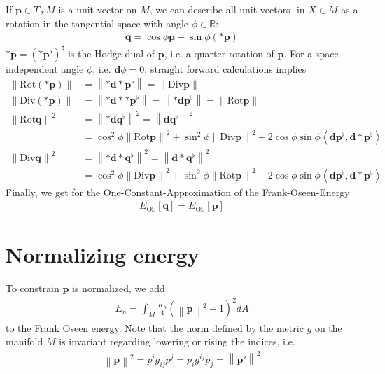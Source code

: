 \documentclass{scrartcl}
\newcommand{\exd}{\mathbf{d}}
\newcommand{\Div}{\text{Div}}
\newcommand{\Rot}{\text{Rot}}
\newcommand{\R}{\mathds{R}}
\newcommand{\M}{M}
\newcommand{\dA}{dA}
\newcommand{\p}{\mathbf{p}}
\newcommand{\q}{\mathbf{q}}
\newcommand{\pfl}{\mathbf{p}^{\flat}}
\newcommand{\qfl}{\mathbf{q}^{\flat}}
\newcommand{\EOS}{E_{\text{OS}}}
\newcommand{\EN}{E_{n}}
\begin{document}
  If \( \p\in T_{X}\M \) is a unit vector on \( \M \), we can describe all unit vectors \(  \) in \( X\in\M \) as a rotation in the tangential space
  with angle \( \phi\in\R \):
  \begin{align}
    \q = \cos\phi\p + \sin\phi\left( *\p \right)
  \end{align}
  \( *\p = \left( *\pfl \right)^{\sharp}\) is the Hodge dual of \( \p \), i.e. a quarter rotation of \( \p \). 
  For a space independent angle \( \phi \), i.e. \( \exd\phi=0 \), straight forward calculations implies
  \begin{align}
     \left\| \Rot (*\p) \right\| &=  \left\| *\exd*\pfl \right\| = \left\| \Div\p \right\|\\
     \left\| \Div (*\p) \right\| &= \left\| *\exd**\pfl  \right\| = \left\| *\exd\pfl  \right\| = \left\|\Rot\p\right\|\\ 
     \left\| \Rot\q \right\|^{2} &= \left\| *\exd\qfl \right\|^{2} = \left\| \exd\qfl \right\|^{2} \\
                                      &=  \cos^{2}\phi\left\| \Rot\p \right\|^{2} 
                                        + \sin^{2}\phi\left\| \Div\p \right\|^{2}
                                        + 2\cos\phi\sin\phi\left\langle \exd\pfl, \exd * \pfl \right\rangle\\
    \left\| \Div\q \right\|^{2} &= \left\| *\exd*\qfl \right\|^{2} = \left\| \exd*\qfl \right\|^{2}\\
                                     &= \cos^{2}\phi\left\| \Div\p \right\|^{2} 
                                        + \sin^{2}\phi\left\| \Rot\p \right\|^{2}
                                        - 2\cos\phi\sin\phi\left\langle \exd\pfl, \exd * \pfl \right\rangle  
  \end{align}
  Finally, we get for the One-Constant-Approximation of the Frank-Oseen-Energy
  \begin{align}
    \EOS[\q] = \EOS[\p]
  \end{align}


\section{Normalizing energy}

To constrain \( \p \) is normalized, we add
\begin{align}
  \EN = \int_{\M} \frac{K_{n}}{4} \left( \left\| \p \right\|^{2} - 1 \right)^{2} \dA
\end{align}
to the Frank Oseen energy.
Note that the norm defined by the metric \( g \) on the manifold \( \M \) is invariant regarding lowering or rising the indices, i.e.
\begin{align}
  \left\| \p \right\|^{2} = p^{i}g_{ij}p^{j} = p_{i} g^{ij} p_{j} = \left\| \pfl \right\|^{2}
\end{align}
\end{document}
